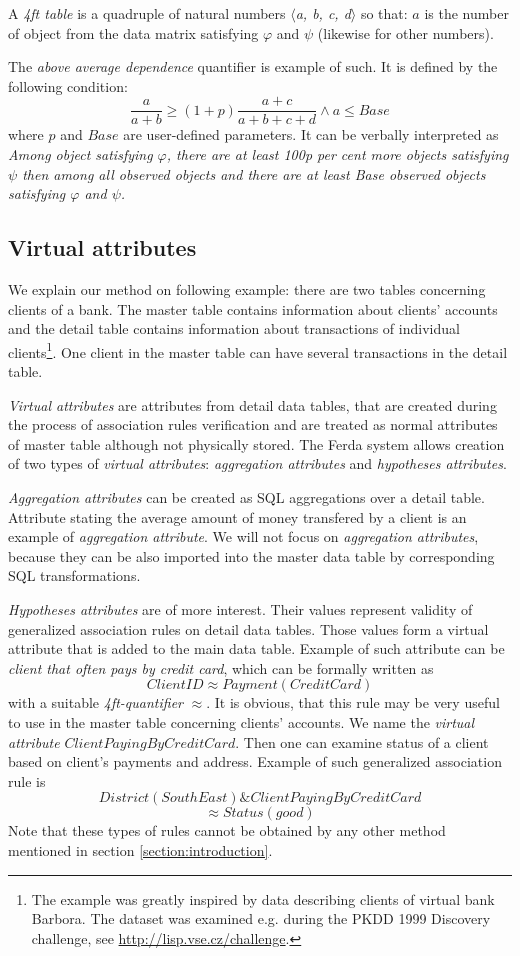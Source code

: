 \documentclass[conference]{IEEEtran}
\begin{document}
A \emph{4ft table} is a quadruple of natural numbers 
\emph{$\langle$a, b, c, d$\rangle$}
so that: $a$ is the number of object from the data matrix satisfying $\varphi$ and 
$\psi$ (likewise for other numbers). 

The \emph{above average dependence} quantifier is example of such. It is defined 
by the following condition:
$$\frac{a}{a+b}\geq(1+p)\frac{a+c}{a+b+c+d} \wedge a \leq Base$$
where $p$ and $Base$ are user-defined parameters. It can be verbally interpreted
as \emph{Among object satisfying $\varphi$, there are at least 100p per cent 
more objects satisfying $\psi$ then among all observed objects and there are
at least Base observed objects satisfying $\varphi$ and $\psi$.}

\subsection{Virtual attributes}
\label{section:attributes}

We explain our method on following example: there are two tables concerning clients
of a bank. The master table contains information about clients' accounts and the detail 
table contains information about transactions of individual clients\footnote{The
example was greatly inspired by data describing clients of virtual bank Barbora. The
dataset was examined e.g. during the PKDD 1999 Discovery challenge, see 
\url{http://lisp.vse.cz/challenge}.}. One client in the master table can have several transactions in the detail table.

\emph{Virtual attributes} are attributes from detail data tables, that are created
during the process of association rules verification and are treated as normal attributes
of master table although not physically stored. The Ferda system allows creation of
two types of \emph{virtual attributes}: \emph{aggregation attributes} and \emph{hypotheses
attributes}. 

\emph{Aggregation attributes} can be created as SQL aggregations over
a detail table. Attribute stating the average amount of money transfered by a client
is an example of \emph{aggregation attribute}. We will not focus on \emph{aggregation
attributes}, because they can be also imported into the master data table by corresponding
SQL transformations.

\emph{Hypotheses attributes} are of more interest. Their values represent validity of 
generalized association rules on detail data tables. Those values form a virtual 
attribute that is added to the main data table. Example of such attribute can be
\emph{client that often
pays by credit card}, which can be formally written as 
$$ClientID \approx Payment(CreditCard)$$
with a suitable \emph{4ft-quantifier} $\approx$. It is obvious, that this rule
may be very useful to use in the master table concerning clients' accounts. We
name the \emph{virtual attribute} $ClientPayingByCreditCard$. Then one can 
examine status of a client based on client's payments and address. Example of
such generalized association rule is
$$District(SouthEast) \& ClientPayingByCreditCard$$
$$\approx Status(good)$$
Note that these types of rules cannot be obtained by any other method mentioned in
section \ref{section:introduction}.
\end{document}
